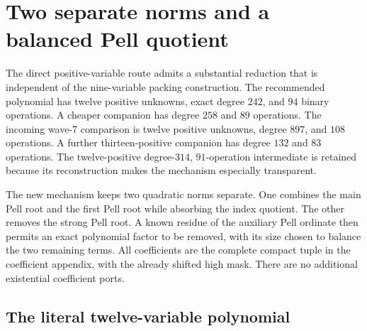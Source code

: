 \section{Two separate norms and a balanced Pell quotient}
\label{sec:low-degree}

The direct positive-variable route admits a substantial reduction that is
independent of the nine-variable packing construction.  The recommended
polynomial has twelve positive unknowns, exact degree $242$, and $94$ binary
operations.  A cheaper companion has degree $258$ and $89$ operations.
The incoming wave-7 comparison is twelve positive unknowns, degree $897$,
and $108$ operations.  A further thirteen-positive companion has degree
$132$ and $83$ operations.  The twelve-positive degree-$314$, $91$-operation
intermediate is retained because its reconstruction makes the mechanism
especially transparent.

The new mechanism keeps two quadratic norms separate.  One combines the
main Pell root and the first Pell root while absorbing the index quotient.
The other removes the strong Pell root.  A known residue of the auxiliary
Pell ordinate then permits an exact polynomial factor to be removed, with
its size chosen to balance the two remaining terms.  All coefficients are
the complete compact tuple in the coefficient appendix, with the already
shifted high mask.  There are no additional existential coefficient ports.

\subsection{The literal twelve-variable polynomial}

